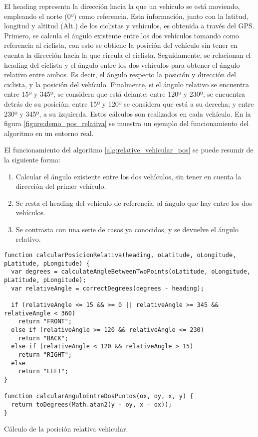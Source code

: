 El heading representa la dirección hacia la que un vehículo se está moviendo, empleando el norte (0º) como referencia. Esta información, junto con la latitud, longitud y altitud (Alt.) de los ciclistas y vehículos, es obtenida a través del GPS. Primero, se calcula el ángulo existente entre los dos vehículos tomando como referencia al ciclista, con esto se obtiene la posición del vehículo sin tener en cuenta la dirección hacia la que circula el ciclista. Seguidamente, se relacionan el heading del ciclista y el ángulo entre los dos vehículos para obtener el ángulo relativo entre ambos. Es decir, el ángulo respecto la posición y dirección del ciclista, y la posición del vehículo. Finalmente, si el ángulo relativo se encuentra entre 15º y 345º, se considera que está delante; entre 120º y 230º, se encuentra detrás de su posición; entre 15º y 120º se considera que está a su derecha; y entre 230º y 345º, a su izquierda. Estos cálculos son realizados en cada vehículo. En la figura \ref{figure:demo_pos_relativa} se muestra un ejemplo del funcionamiento del algoritmo en un entorno real.

El funcionamiento del algoritmo \ref{alg:relative_vehicular_pos} se puede resumir de la siguiente forma:
\begin{enumerate}
	\item Calcular el ángulo existente entre los dos vehículos, sin tener en cuenta la dirección del primer vehículo.
	\item Se resta el heading del vehículo de referencia, al ángulo que hay entre los dos vehículos.
	\item Se contrasta con una serie de casos ya conocidos, y se devuelve el ángulo	relativo.
\end{enumerate}

\begin{listing}
	\begin{minipage}{.4\textwidth}
		\begin{verbatim}
function calcularPosicionRelativa(heading, oLatitude, oLongitude, pLatitude, pLongitude) {
  var degrees = calculateAngleBetweenTwoPoints(oLatitude, oLongitude, pLatitude, pLongitude);
  var relativeAngle = correctDegrees(degrees - heading);
				
  if (relativeAngle <= 15 && >= 0 || relativeAngle >= 345 && relativeAngle < 360)
    return "FRONT";
  else if (relativeAngle >= 120 && relativeAngle <= 230)
    return "BACK";
  else if (relativeAngle < 120 && relativeAngle > 15)
    return "RIGHT";
  else
    return "LEFT";
}

function calcularAnguloEntreDosPuntos(ox, oy, x, y) {
  return toDegrees(Math.atan2(y - oy, x - ox));
}
\end{verbatim}
\end{minipage}
\caption{Cálculo de la posición relativa vehicular.}\label{alg:relative_vehicular_pos}
\end{listing}

